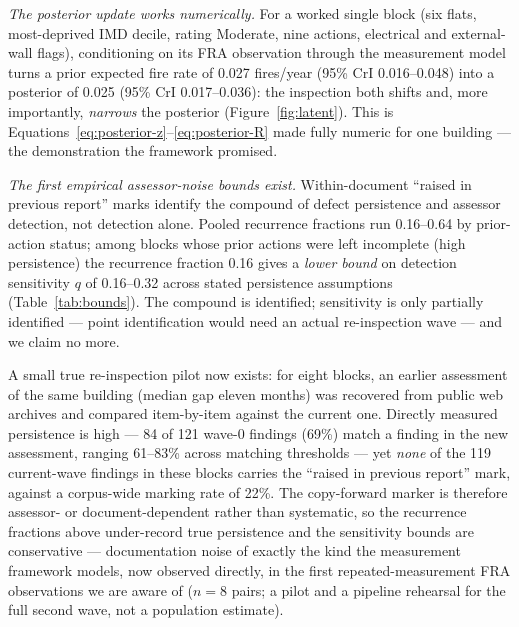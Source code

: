 \emph{The posterior update works numerically.} For a worked single block (six flats,
most-deprived IMD decile, rating Moderate, nine actions, electrical and external-wall
flags), conditioning on its FRA observation through the measurement model turns a
prior expected fire rate of 0.027 fires/year (95\% CrI 0.016--0.048) into a posterior
of 0.025 (95\% CrI 0.017--0.036): the inspection both shifts and, more importantly,
\emph{narrows} the posterior (Figure~\ref{fig:latent}). This is
Equations~\eqref{eq:posterior-z}--\eqref{eq:posterior-R} made fully numeric for one
building --- the demonstration the framework promised.

\emph{The first empirical assessor-noise bounds exist.} Within-document ``raised in
previous report'' marks identify the compound of defect persistence and assessor
detection, not detection alone. Pooled recurrence fractions run 0.16--0.64 by
prior-action status; among blocks whose prior actions were left incomplete (high
persistence) the recurrence fraction 0.16 gives a \emph{lower bound} on detection
sensitivity $q$ of 0.16--0.32 across stated persistence assumptions
(Table~\ref{tab:bounds}). The compound is identified; sensitivity is only partially
identified --- point identification would need an actual re-inspection wave --- and we
claim no more.

A small true re-inspection pilot now exists: for eight blocks, an earlier assessment
of the same building (median gap eleven months) was recovered from public web
archives and compared item-by-item against the current one. Directly measured
persistence is high --- 84 of 121 wave-0 findings (69\%) match a finding in the new
assessment, ranging 61--83\% across matching thresholds --- yet \emph{none} of the
119 current-wave findings in these blocks carries the ``raised in previous report''
mark, against a corpus-wide marking rate of 22\%. The copy-forward marker is
therefore assessor- or document-dependent rather than systematic, so the recurrence
fractions above under-record true persistence and the sensitivity bounds are
conservative --- documentation noise of exactly the kind the measurement framework
models, now observed directly, in the first repeated-measurement FRA observations we
are aware of ($n=8$ pairs; a pilot and a pipeline rehearsal for the full second
wave, not a population estimate).

